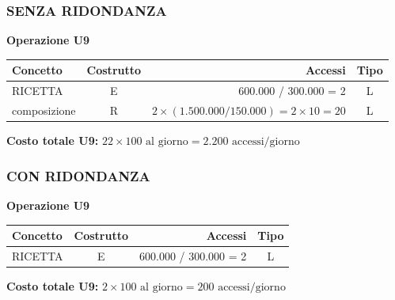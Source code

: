 \subsubsection*{SENZA RIDONDANZA}

\noindent\textbf{Operazione U9}
\begin{table}[H]
\centering
\renewcommand{\arraystretch}{1.2}
\setlength{\tabcolsep}{8pt}
\begin{tabularx}{\textwidth}{|X|c|r|c|}
\hline
\textbf{Concetto} & \textbf{Costrutto} & \textbf{Accessi} & \textbf{Tipo} \\
\hline
RICETTA & E & 600.000 / 300.000 = 2 & L \\
\hline
composizione & R & $2 \times (1.500.000 / 150.000) = 2 \times 10 = 20$ & L \\
\hline
\end{tabularx}
\end{table}
\textbf{Costo totale U9:} $22 \times 100 \mbox{ al giorno} = 2.200 \mbox{ accessi/giorno}$

\vspace{2em}

\subsubsection*{CON RIDONDANZA}

\noindent\textbf{Operazione U9}
\begin{table}[H]
\centering
\renewcommand{\arraystretch}{1.2}
\setlength{\tabcolsep}{8pt}
\begin{tabularx}{\textwidth}{|X|c|r|c|}
\hline
\textbf{Concetto} & \textbf{Costrutto} & \textbf{Accessi} & \textbf{Tipo} \\
\hline
RICETTA & E & 600.000 / 300.000 = 2 & L \\
\hline
\end{tabularx}
\end{table}
\textbf{Costo totale U9:} $2 \times 100 \mbox{ al giorno} = 200 \mbox{ accessi/giorno}$

\vspace{1.5em}

\noindent{}

